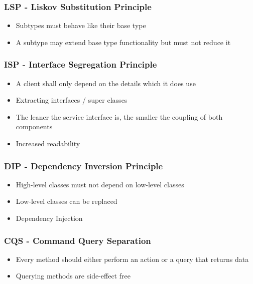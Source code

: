 \subsubsection{LSP - Liskov Substitution Principle}
\begin{itemize}
    \item Subtypes must behave like their base type
    \item A subtype may extend base type functionality but must not reduce it
\end{itemize}

\subsubsection{ISP - Interface Segregation Principle}
\begin{itemize}
    \item A client shall only depend on the details which it does use
    \item Extracting interfaces / super classes
    \item The leaner the service interface is, the smaller the coupling of both components
    \item Increased readability
\end{itemize}

\subsubsection{DIP - Dependency Inversion Principle}
\begin{itemize}
    \item High-level classes must not depend on low-level classes
    \item Low-level classes can be replaced
    \item Dependency Injection
\end{itemize}

\subsubsection{CQS - Command Query Separation}
\begin{itemize}
    \item Every method should either perform an action or a query that returns data
    \item Querying methods are side-effect free
\end{itemize}











